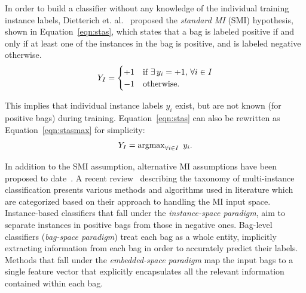 \documentclass[reqno]{vcuthesis}
\numberwithin{equation}{chapter}
\begin{document}
In order to build a classifier without any knowledge of the individual training instance labels, Dietterich et. al.~\cite{Dietterich1997} proposed the \textit{standard MI} (SMI) hypothesis, shown in Equation~\eqref{eqn:stas}, which states that a bag is labeled positive if and only if at least one of the instances in the bag is positive, and is labeled negative otherwise.
\begin{equation}
\centering \label{eqn:stas}
 Y_I = \begin{cases}
			+1 & \text{if }\exists\, y_i = +1,\, \forall i \in I \\
			-1 & \text{otherwise}.
		  \end{cases}
\end{equation}

This implies that individual instance labels $y_i$ exist, but are not known (for positive bags) during training. Equation~\eqref{eqn:stas} can also be rewritten as Equation~\eqref{eqn:stasmax} for simplicity:
\begin{equation}
\centering \label{eqn:stasmax}
Y_I = \text{argmax}_{\forall i \in I}\,\,\, y_i.
\end{equation}

In addition to the SMI assumption, alternative MI assumptions have been proposed to date~\cite{Foulds2010}. A recent review~\cite{Amores2013} describing the taxonomy of multi-instance classification presents various methods and algorithms used in literature which are categorized based on their approach to handling the MI input space. Instance-based classifiers that fall under the \textit{instance-space paradigm}, aim to separate instances in positive bags from those in negative ones. Bag-level classifiers (\textit{bag-space paradigm}) treat each bag as a whole entity, implicitly extracting information from each bag in order to accurately predict their labels. Methods that fall under the \textit{embedded-space paradigm} map the input bags to a single feature vector that explicitly encapsulates all the relevant information contained within each bag.
\end{document}
